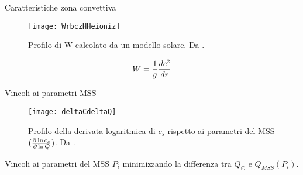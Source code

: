 \begin{frame}{Caratteristiche zona convettiva}

\begin{figure}[!ht]
        \texttt{[image: WrbczHHeioniz]}
        \caption{Profilo di W calcolato da un modello solare. Da \cite{basu2008helioseismology}.}\label{fig:dlessc}
    
\end{figure}

\begin{equation}
W=\frac{1}{g}\TDy{r}{c^2}%
\end{equation}


\end{frame}

\begin{frame}{Vincoli ai parametri MSS}

\begin{figure}[!ht]
        \texttt{[image: deltaCdeltaQ]}
        \caption{Profilo della derivata logaritmica di $c_s$ rispetto ai parametri del MSS $(\PDly{Q}{c_s})$. Da \cite{villante2014chemical}.}
\end{figure}

Vincoli ai parametri del MSS $P_i$ minimizzando la differenza tra $Q_{\odot}$ e $Q_{MSS}(P_i)$. 

\end{frame}